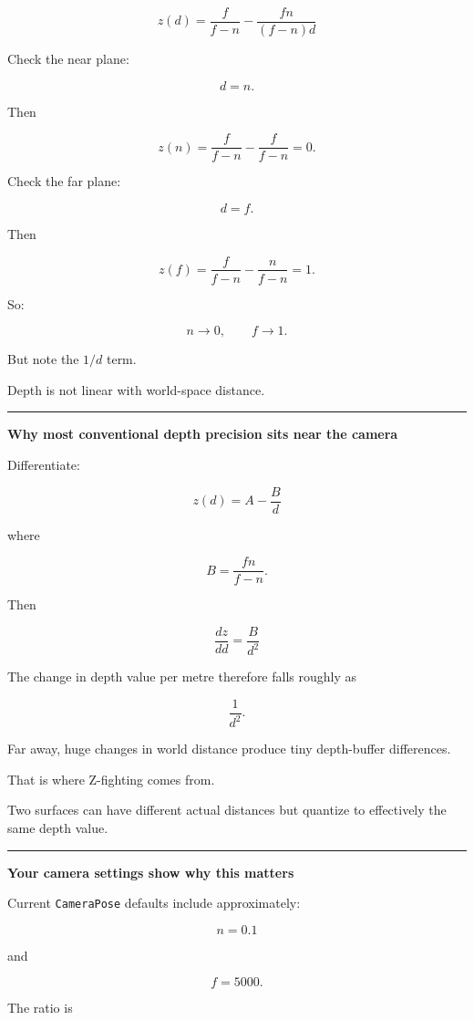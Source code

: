 \[
\boxed{
z(d)
=
\frac{f}{f-n}
-
\frac{fn}{(f-n)d}
}
\]

Check the near plane:

\[
d=n.
\]

Then

\[
z(n)=
\frac{f}{f-n}
-
\frac{f}{f-n}
=0.
\]

Check the far plane:

\[
d=f.
\]

Then

\[
z(f)=
\frac{f}{f-n}
-
\frac{n}{f-n}
=1.
\]

So:

\[
n\rightarrow0,
\qquad
f\rightarrow1.
\]

But note the \(1/d\) term.

Depth is not linear with world-space distance.

\begin{center}\rule{0.5\linewidth}{0.5pt}\end{center}

\textbf{Why most conventional depth precision sits near the camera}

Differentiate:

\[
z(d)=A-\frac{B}{d}
\]

where

\[
B=\frac{fn}{f-n}.
\]

Then

\[
\boxed{
\frac{dz}{dd}
=
\frac{B}{d^2}
}
\]

The change in depth value per metre therefore falls roughly as

\[
\frac1{d^2}.
\]

Far away, huge changes in world distance produce tiny depth-buffer differences.

That is where Z-fighting comes from.

Two surfaces can have different actual distances but quantize to effectively the same depth value.

\begin{center}\rule{0.5\linewidth}{0.5pt}\end{center}

\textbf{Your camera settings show why this matters}

Current \texttt{CameraPose} defaults include approximately:

\[
n=0.1
\]

and

\[
f=5000.
\]

The ratio is

